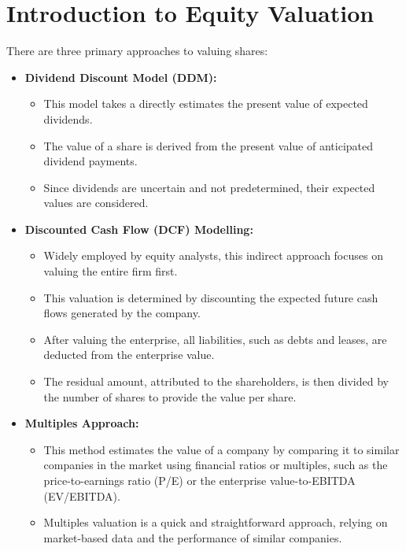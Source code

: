 \section{Introduction to Equity Valuation}
There are three primary approaches to valuing shares:

\begin{itemize}
    \item \textbf{Dividend Discount Model (DDM):} 
    \begin{itemize}
        \item This model takes a directly estimates the present value of expected dividends. 
        \item The value of a share is derived from the present value of anticipated dividend payments. 
        \item Since dividends are uncertain and not predetermined, their expected values are considered.
    \end{itemize}
    
    \item \textbf{Discounted Cash Flow (DCF) Modelling:} 
    \begin{itemize}
        \item Widely employed by equity analysts, this indirect approach focuses on valuing the entire firm first. 
        \item This valuation is determined by discounting the expected future cash flows generated by the company. 
        \item After valuing the enterprise, all liabilities, such as debts and leases, are deducted from the enterprise value. 
        \item The residual amount, attributed to the shareholders, is then divided by the number of shares to provide the value per share. 
    \end{itemize}
    
    \item \textbf{Multiples Approach:} 
    \begin{itemize}
        \item This method estimates the value of a company by comparing it to similar companies in the market using financial ratios or multiples, such as the price-to-earnings ratio (P/E) or the enterprise value-to-EBITDA (EV/EBITDA). 
        \item Multiples valuation is a quick and straightforward approach, relying on market-based data and the performance of similar companies.
    \end{itemize}
\end{itemize}


